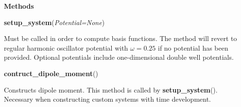 \begin{tcolorbox}
{    \vspace{1em}
    \textbf{Methods}

    \hspace{2em} \textbf{setup\_system}(\emph{Potential=None})
        \begin{adjustwidth}{4em}{}
        Must be called in order to compute basis functions. The method will 
        revert to regular harmonic oscillator potential with $\omega=0.25$
        if no potential has been provided.
        Optional potentials include one-dimensional double well potentials.           
        \end{adjustwidth}
   
    \hspace{2em} \textbf{contruct\_dipole\_moment}()
        \begin{adjustwidth}{4em}{}
        Constructs dipole moment. This method is called by
        \textbf{setup\_system}(). Necessary when constructing custom systems with 
        time development.
        \end{adjustwidth}
    }
\end{tcolorbox}
